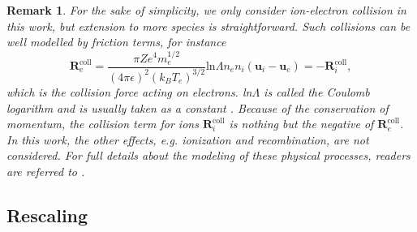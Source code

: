 \documentclass{article}
\newtheorem*{remark}{Remark}
\begin{document}
\begin{remark}
  \label{rem:coll}
  For the sake of simplicity, we only consider ion-electron collision in this work, but
extension to more species is straightforward. Such collisions can be well modelled by
friction terms, for instance \citep[][Sec. 5.6.2]{chen2016}
\begin{equation} \label{equ:collision}
    \mathbf{R}_{e}^{\text{coll}} = \frac{\pi Ze^4m_e^{1/2}}{(4\pi\epsilon)^2(k_BT_e)^{3/2}}\text{ln}\Lambda n_en_i(\mathbf{u}_i - \mathbf{u}_e) = - \mathbf{R}_{i}^{\text{coll}},  
\end{equation}
which is the collision force acting on electrons. ln$\Lambda$ is called the \emph{Coulomb
  logarithm} and is usually taken as a constant \cite{chen2016}. Because of the
conservation of momentum, the collision term for ions $\mathbf{R}_{i}^{\text{coll}}$ is
nothing but the negative of $\mathbf{R}_{e}^{\text{coll}}$. In this work, the other
effects, e.g. ionization and recombination, are not considered. For full details about the
modeling of these physical processes, readers are referred to
\cite[][Sec. 3.2]{fuchs_2021}.
\end{remark}

\subsection{Rescaling}
\label{sec:rescaling}
\end{document}
